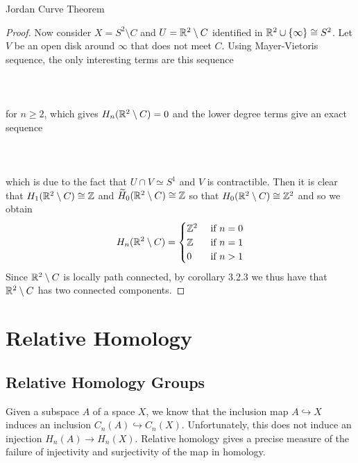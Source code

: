 \documentclass[a4paper]{article}
\begin{document}
\begin{thm}{Jordan Curve Theorem}{}
\begin{proof}
Now consider $X=S^2\setminus C$ and $U=\mathbb{R}^2\setminus C$ identified in $\mathbb{R}^2\cup\{\infty\}\cong S^2$. Let $V$ be an open disk around $\infty$ that does not meet $C$. Using Mayer-Vietoris sequence, the only interesting terms are this sequence \\~\\
\\~\\
for $n\geq 2$, which gives $H_n(\mathbb{R}^2\setminus C)=0$ and the lower degree terms give an exact sequence \\~\\
\\~\\
which is due to the fact that $U\cap V\simeq S^1$ and $V$ is contractible. Then it is clear that $H_1(\mathbb{R}^2\setminus C)\cong\mathbb{Z}$ and $\widetilde{H}_0(\mathbb{R}^2\setminus C)\cong\mathbb{Z}$ so that $H_0(\mathbb{R}^2\setminus C)\cong\mathbb{Z}^2$ and so we obtain $$H_n(\mathbb{R}^2\setminus C)=\begin{cases}
\mathbb{Z}^2 & \text{ if } n=0\\
\mathbb{Z} & \text{ if } n=1\\
0 & \text{ if } n>1
\end{cases}$$
Since $\mathbb{R}^2\setminus C$ is locally path connected, by corollary 3.2.3 we thus have that $\mathbb{R}^2\setminus C$ has two connected components. 
\end{proof}
\end{thm}

\pagebreak
\section{Relative Homology}
\subsection{Relative Homology Groups}
Given a subspace $A$ of a space $X$, we know that the inclusion map $A\hookrightarrow X$ induces an inclusion $C_n(A)\hookrightarrow C_n(X)$. Unfortunately, this does not induce an injection $H_n(A)\to H_n(X)$. Relative homology gives a precise measure of the failure of injectivity and surjectivity of the map in homology. 
\end{document}
